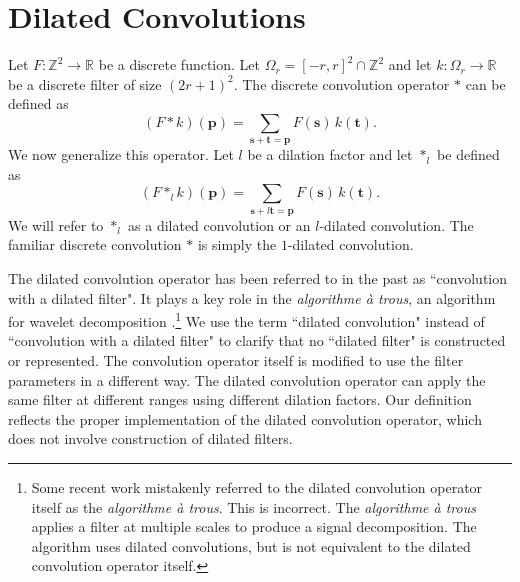 \documentclass{article} %
\def\pp{\mathbf p}
\def\ss{\mathbf s}
\def\tt{\mathbf t}
\def\Re{\mathbb{R}}
\def\Ze{\mathbb{Z}}
\begin{document}
\section{Dilated Convolutions}
\label{sec:convolutions}

Let $F: \Ze^2 \rightarrow \Re$ be a discrete function. Let $\Omega_r = [-r,r]^2 \cap \Ze^2$ and let \mbox{$k: \Omega_r \rightarrow \Re$} be a discrete filter of size $(2r+1)^2$. The discrete convolution operator $\ast$ can be defined as
\begin{equation}
(F \ast k)(\pp) = \sum_{\ss + \tt = \pp} F(\ss) \, k(\tt).
\label{eq:regular}
\end{equation}
We now generalize this operator. Let $l$ be a dilation factor and let $\ast_l$ be defined as
\begin{equation}
(F \ast_l k)(\pp) = \sum_{\ss + l \tt = \pp} F(\ss) \, k(\tt).
\label{eq:dilated}
\end{equation}
We will refer to $\ast_l$ as a dilated convolution or an $l$-dilated convolution. The familiar discrete convolution $\ast$ is simply the $1$-dilated convolution.

The dilated convolution operator has been referred to in the past as ``convolution with a dilated filter". It plays a key role in the {\em algorithme \`{a} trous}, an algorithm for wavelet decomposition \citep{Holschneider1987,Shensa1992}.\footnote{Some recent work mistakenly referred to the dilated convolution operator itself as the {\em algorithme \`{a} trous}. This is incorrect. The {\em algorithme \`{a} trous} applies a filter at multiple scales to produce a signal decomposition. The algorithm uses dilated convolutions, but is not equivalent to the dilated convolution operator itself.} We use the term ``dilated convolution" instead of ``convolution with a dilated filter" to clarify that no ``dilated filter" is constructed or represented. The convolution operator itself is modified to use the filter parameters in a different way. The dilated convolution operator can apply the same filter at different ranges using different dilation factors. Our definition reflects the proper implementation of the dilated convolution operator, which does not involve construction of dilated filters.

\end{document}
